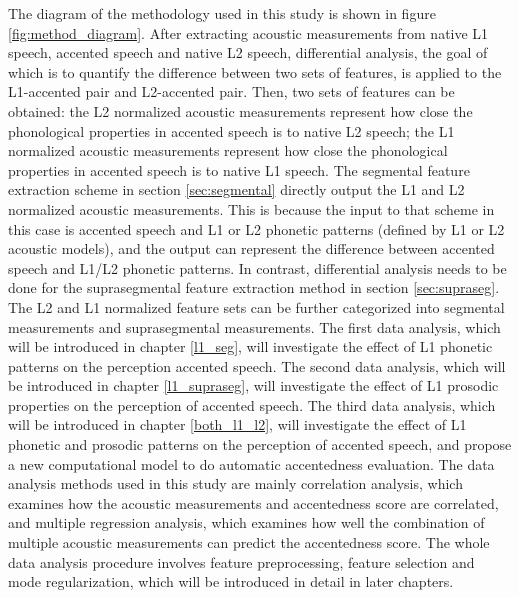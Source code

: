 The diagram of the methodology used in this study is shown in figure \ref{fig:method_diagram}. After extracting acoustic measurements from native L1 speech, accented speech and native L2 speech, differential analysis, the goal of which is to quantify the difference between two sets of features, is applied to the L1-accented pair and L2-accented pair. Then, two sets of features can be obtained: the L2 normalized acoustic measurements represent how close the phonological properties in accented speech is to native L2 speech; the L1 normalized acoustic measurements represent how close the phonological properties in accented speech is to native L1 speech. The segmental feature extraction scheme in section \ref{sec:segmental} directly output the L1 and L2 normalized acoustic measurements. This is because the input to that scheme in this case is accented speech and L1 or L2 phonetic patterns (defined by L1 or L2 acoustic models), and the output can represent the difference between accented speech and L1/L2 phonetic patterns. In contrast, differential analysis needs to be done for the suprasegmental feature extraction method in section \ref{sec:supraseg}. The L2 and L1 normalized feature sets can be further categorized into segmental measurements and suprasegmental measurements. The first data analysis, which will be introduced in chapter \ref{l1_seg}, will investigate the effect of L1 phonetic patterns on the perception accented speech.  The second data analysis, which will be introduced in chapter \ref{l1_supraseg}, will investigate the effect of L1 prosodic properties on the perception of accented speech. The third data analysis, which will be introduced in chapter \ref{both_l1_l2}, will investigate the effect of L1 phonetic and prosodic patterns on the perception of accented speech, and propose a new computational model to do automatic accentedness evaluation. The data analysis methods used in this study are mainly correlation analysis, which examines how the acoustic measurements and accentedness score are correlated, and multiple regression analysis, which examines how well the combination of multiple acoustic measurements can predict the accentedness score. The whole data analysis procedure involves feature preprocessing, feature selection and mode regularization, which will be introduced in detail in later chapters.
